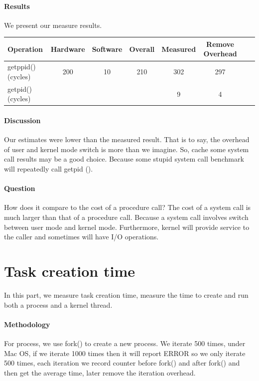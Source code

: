 \paragraph{Results}
We present our measure results.

\begin{center}
\begin{tabular}{l*{6}{c}r}
Operation              & Hardware  & Software  & Overall  & Measured & Remove Overhead  \\
\hline
getppid() (cycles) & 200 & 10 & 210 & 302 & 297  \\
getpid() (cycles) & ~ & ~ & ~ & 9 & 4  \\
\end{tabular}
\end{center}

\paragraph{Discussion}
Our estimates were lower than the measured result. That is to say, the overhead of user and kernel mode switch is more than we imagine. So, cache some system call results may be a good choice. Because some stupid system call benchmark will repeatedly call getpid ().

\paragraph{Question} How does it compare to the cost of a procedure call? The cost of a system call is much larger than that of a procedure call. Because a system call involves switch between user mode and kernel mode. Furthermore, kernel will provide service to the caller and sometimes will have I/O operations.

\section{Task creation time}
In this part, we measure task creation time, measure the time to create and run both a process and a kernel thread.

\paragraph{Methodology}
For process, we use fork() to create a new process. We iterate 500 times, under Mac OS, if we iterate 1000 times then it will report ERROR so we only iterate 500 times, each iteration we record counter before fork() and after fork() and then get the average time, later remove the iteration overhead.

